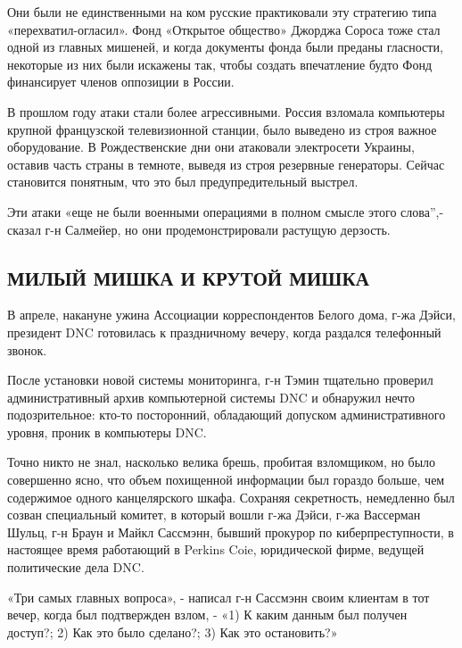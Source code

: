 Они были не единственными на ком русские практиковали эту стратегию типа
«перехватил-огласил». Фонд «Открытое общество» Джорджа Сороса тоже стал
одной из главных мишеней, и когда документы фонда были преданы
гласности, некоторые из них были искажены так, чтобы создать впечатление
будто Фонд финансирует членов оппозиции в России.

В прошлом году атаки стали более агрессивными. Россия взломала
компьютеры крупной французской телевизионной станции, было выведено из
строя важное оборудование. В Рождественские дни они атаковали
электросети Украины, оставив часть страны в темноте, выведя из строя
резервные генераторы. Сейчас становится понятным, что это был
предупредительный выстрел.

Эти атаки «еще не были военными операциями в полном смысле этого
слова'',- сказал г-н Салмейер, но они продемонстрировали растущую
дерзость.

\hypertarget{ux43cux438ux43bux44bux439-ux43cux438ux448ux43aux430-ux438-ux43aux440ux443ux442ux43eux439-ux43cux438ux448ux43aux430}{%
\subsection{\texorpdfstring{\textbf{МИЛЫЙ МИШКА И КРУТОЙ
МИШКА}}{МИЛЫЙ МИШКА И КРУТОЙ МИШКА}}\label{ux43cux438ux43bux44bux439-ux43cux438ux448ux43aux430-ux438-ux43aux440ux443ux442ux43eux439-ux43cux438ux448ux43aux430}}

В апреле, накануне ужина Ассоциации корреспондентов Белого дома, г-жа
Дэйси, президент DNC готовилась к праздничному вечеру, когда раздался
телефонный звонок.

После установки новой системы мониторинга, г-н Тэмин тщательно проверил
административный архив компьютерной системы DNC и обнаружил нечто
подозрительное: кто-то посторонний, обладающий допуском
административного уровня, проник в компьютеры DNC.

Точно никто не знал, насколько велика брешь, пробитая взломщиком, но
было совершенно ясно, что объем похищенной информации был гораздо
больше, чем содержимое одного канцелярского шкафа. Сохраняя секретность,
немедленно был созван специальный комитет, в который вошли г-жа Дэйси,
г-жа Вассерман Шульц, г-н Браун и Майкл Сассмэнн, бывший прокурор по
киберпреступности, в настоящее время работающий в Perkins Coie,
юридической фирме, ведущей политические дела DNC.

«Три самых главных вопроса», - написал г-н Сассмэнн своим клиентам в тот
вечер, когда был подтвержден взлом, - «1) К каким данным был получен
доступ?; 2) Как это было сделано?; 3) Как это остановить?»

